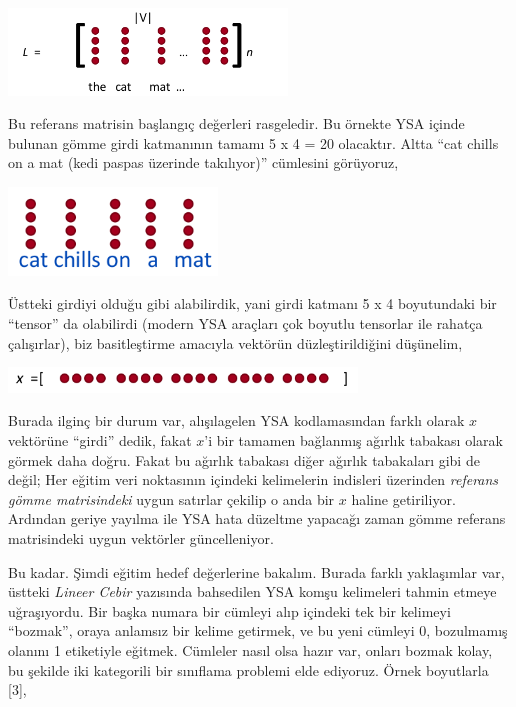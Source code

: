 \documentclass[12pt,fleqn]{article}\usepackage{../../common}
\begin{document}
\includegraphics[width=20em]{nlp_02.png}

Bu referans matrisin başlangıç değerleri rasgeledir. Bu örnekte YSA içinde
bulunan gömme girdi katmanının tamamı 5 x 4 = 20 olacaktır. Altta ``cat
chills on a mat (kedi paspas üzerinde takılıyor)'' cümlesini görüyoruz,

\hspace{1.2cm}
\includegraphics[width=15em]{nlp_03.png}

Üstteki girdiyi olduğu gibi alabilirdik, yani girdi katmanı 5 x 4
boyutundaki bir ``tensor'' da olabilirdi (modern YSA araçları çok boyutlu
tensorlar ile rahatça çalışırlar), biz basitleştirme amacıyla vektörün
düzleştirildiğini düşünelim,

\includegraphics[width=25em]{nlp_04.png}

Burada ilginç bir durum var, alışılagelen YSA kodlamasından farklı olarak
$x$ vektörüne ``girdi'' dedik, fakat $x$'i bir tamamen bağlanmış ağırlık
tabakası olarak görmek daha doğru. Fakat bu ağırlık tabakası diğer ağırlık
tabakaları gibi de değil; Her eğitim veri noktasının içindeki kelimelerin
indisleri üzerinden {\em referans gömme matrisindeki} uygun satırlar
çekilip o anda bir $x$ haline getiriliyor. Ardından geriye yayılma ile YSA
hata düzeltme yapacağı zaman gömme referans matrisindeki uygun vektörler
güncelleniyor.

Bu kadar. Şimdi eğitim hedef değerlerine bakalım. Burada farklı yaklaşımlar
var, üstteki {\em Lineer Cebir} yazısında bahsedilen YSA komşu kelimeleri
tahmin etmeye uğraşıyordu. Bir başka numara bir cümleyi alıp içindeki tek
bir kelimeyi ``bozmak'', oraya anlamsız bir kelime getirmek, ve bu yeni
cümleyi 0, bozulmamış olanını 1 etiketiyle eğitmek. Cümleler nasıl olsa hazır
var, onları bozmak kolay, bu şekilde iki kategorili bir sınıflama problemi
elde ediyoruz. Örnek boyutlarla [3],
\end{document}
